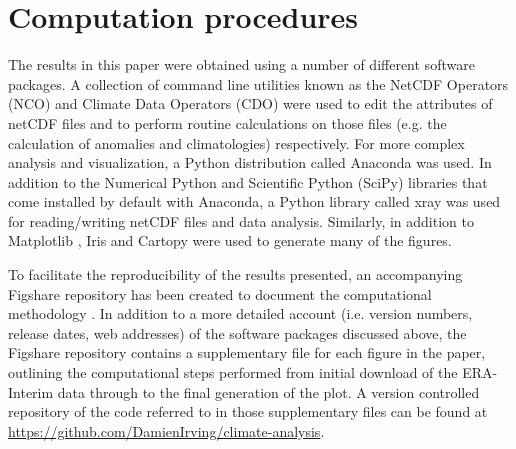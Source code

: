 \section{Computation procedures}\label{s:computation}

The results in this paper were obtained using a number of different software packages. A collection of command line utilities known as the NetCDF Operators (NCO) and Climate Data Operators (CDO) were used to edit the attributes of netCDF files and to perform routine calculations on those files (e.g. the calculation of anomalies and climatologies) respectively. For more complex analysis and visualization, a Python distribution called Anaconda was used. In addition to the Numerical Python \citep[NumPy;][]{VanDerWalt2011} and Scientific Python (SciPy) libraries that come installed by default with Anaconda, a Python library called xray was used for reading/writing netCDF files and data analysis. Similarly, in addition to Matplotlib \citep[the default Python plotting library;][]{Hunter2007}, Iris and Cartopy were used to generate many of the figures.

To facilitate the reproducibility of the results presented, an accompanying Figshare repository has been created to document the computational methodology \citep{Irving2015}. In addition to a more detailed account (i.e. version numbers, release dates, web addresses) of the software packages discussed above, the Figshare repository contains a supplementary file for each figure in the paper, outlining the computational steps performed from initial download of the ERA-Interim data through to the final generation of the plot. A version controlled repository of the code referred to in those supplementary files can be found at \url{https://github.com/DamienIrving/climate-analysis}.

    
    
  